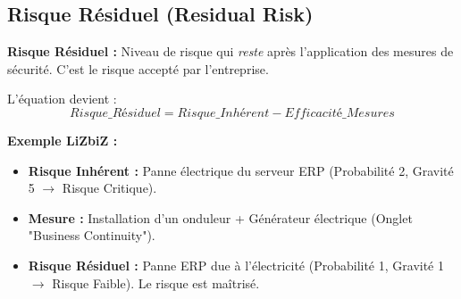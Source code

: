 \subsection{Risque Résiduel (Residual Risk)}

\begin{boxdef}
\textbf{Risque Résiduel :} Niveau de risque qui \textit{reste} après l'application des mesures de sécurité. C'est le risque accepté par l'entreprise.
\end{boxdef}

L'équation devient :
\[ Risque\_Résiduel = Risque\_Inhérent - Efficacité\_Mesures \]

\begin{boxlizbiz}
\textbf{Exemple LiZbiZ :}
\begin{itemize}
    \item \textbf{Risque Inhérent :} Panne électrique du serveur ERP (Probabilité 2, Gravité 5 $\rightarrow$ Risque Critique).
    \item \textbf{Mesure :} Installation d'un onduleur + Générateur électrique (Onglet "Business Continuity").
    \item \textbf{Risque Résiduel :} Panne ERP due à l'électricité (Probabilité 1, Gravité 1 $\rightarrow$ Risque Faible). Le risque est maîtrisé.
\end{itemize}
\end{boxlizbiz}


